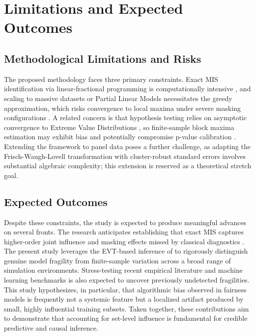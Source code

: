 \documentclass[12pt]{article}
\begin{document}
\section{Limitations and Expected Outcomes}

\subsection{Methodological Limitations and Risks}
The proposed methodology faces three primary constraints. Exact MIS identification via linear-fractional programming is computationally intensive \parencite{kuschnig2021hidden}, and scaling to massive datasets or Partial Linear Models necessitates the greedy approximation, which risks convergence to local maxima under severe masking configurations \parencite{rousseeuw1990unmasking}. A related concern is that hypothesis testing relies on asymptotic convergence to Extreme Value Distributions \parencite{konrad2026testing}, so finite-sample block maxima estimation may exhibit bias and potentially compromise p-value calibration \parencite{dombry2019maximum}. Extending the framework to panel data poses a further challenge, as adapting the Frisch-Waugh-Lovell transformation with cluster-robust standard errors involves substantial algebraic complexity; this extension is reserved as a theoretical stretch goal.

\subsection{Expected Outcomes}
Despite these constraints, the study is expected to produce meaningful advances on several fronts. The research anticipates establishing that exact MIS captures higher-order joint influence and masking effects missed by classical diagnostics \parencite{belsley2005regression}. The present study leverages the EVT-based inference of \textcite{konrad2026testing} to rigorously distinguish genuine model fragility from finite-sample variation across a broad range of simulation environments. Stress-testing recent empirical literature and machine learning benchmarks is also expected to uncover previously undetected fragilities. This study hypothesizes, in particular, that algorithmic bias observed in fairness models \parencite{barocas2020hidden} is frequently not a systemic feature but a localized artifact produced by small, highly influential training subsets. Taken together, these contributions aim to demonstrate that accounting for set-level influence is fundamental for credible predictive and causal inference.
\end{document}
